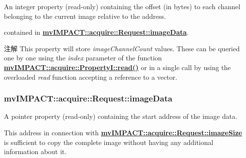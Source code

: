 An integer property {\bfseries }(read-\/only) containing the offset (in bytes) to each channel belonging to the current image relative to the address. 

contained in {\bfseries \hyperlink{classmv_i_m_p_a_c_t_1_1acquire_1_1_request_ad676c45f908bb41df04b15a85bf1f6fd}{mv\+I\+M\+P\+A\+C\+T\+::acquire\+::\+Request\+::image\+Data}}.

\begin{DoxyNote}{注解}
This property will store {\itshape image\+Channel\+Count} values. These can be queried one by one using the {\itshape index} parameter of the function {\bfseries \hyperlink{classmv_i_m_p_a_c_t_1_1acquire_1_1_enum_property_i_a6f88e97f646978391226aaf82cd5955d}{mv\+I\+M\+P\+A\+C\+T\+::acquire\+::\+Property\+I\+::read()}} or in a single call by using the overloaded {\itshape read} function accepting a reference to a vector. 
\end{DoxyNote}
\hypertarget{classmv_i_m_p_a_c_t_1_1acquire_1_1_request_ad676c45f908bb41df04b15a85bf1f6fd}{
\subsubsection[{image\+Data}]{ mv\+I\+M\+P\+A\+C\+T\+::acquire\+::\+Request\+::image\+Data}}\label{classmv_i_m_p_a_c_t_1_1acquire_1_1_request_ad676c45f908bb41df04b15a85bf1f6fd}


A pointer property {\bfseries }(read-\/only) containing the start address of the image data. 

This address in connection with {\bfseries \hyperlink{classmv_i_m_p_a_c_t_1_1acquire_1_1_request_ac568c457aa474e73066bcc369a26cca1}{mv\+I\+M\+P\+A\+C\+T\+::acquire\+::\+Request\+::image\+Size}} is sufficient to copy the complete image without having any additional information about it.

